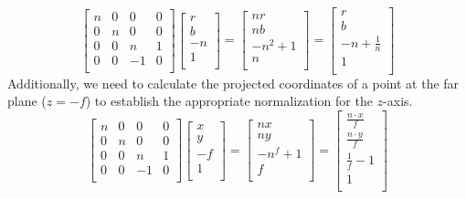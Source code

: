 \[\begin{bmatrix}
    n & 0 & 0 & 0 \\
    0 & n & 0 & 0 \\
    0 & 0 & n & 1 \\
    0 & 0 & -1 & 0 \\
\end{bmatrix} 
\begin{bmatrix}
    r \\
    b \\
    -n \\
    1 \\
\end{bmatrix} =
\begin{bmatrix}
    nr \\
    nb \\
    -n^2 + 1\\
    n \\
\end{bmatrix}=
\begin{bmatrix}
    r \\
    b \\
    -n + \frac{1}{n}\\
    1 \\
\end{bmatrix}\]
Additionally, we need to calculate the projected coordinates of a point at the far plane ($z=-f$) to establish the appropriate normalization for the $z$-axis.
\[\begin{bmatrix}
    n & 0 & 0 & 0 \\
    0 & n & 0 & 0 \\
    0 & 0 & n & 1 \\
    0 & 0 & -1 & 0 \\
\end{bmatrix} 
\begin{bmatrix}
    x \\
    y \\
    -f \\
    1 \\
\end{bmatrix} =
\begin{bmatrix}
    nx\\
    ny \\
    -n^f + 1\\
    f \\
\end{bmatrix}=
\begin{bmatrix}
    \frac{n \cdot x}{f} \\
    \frac{n \cdot y}{f} \\
    \frac{1}{f}-1\\
    1 \\
\end{bmatrix}\]

